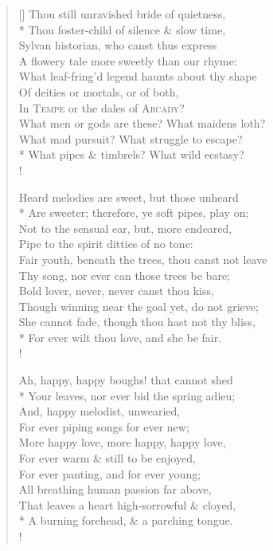 \settowidth{\versewidth}{    Are sweeter; therefore, ye soft pipes, play on;}
\begin{verse}[\versewidth]
Thou still unravished bride of quietness,\\*
\vin Thou foster-child of silence \& slow time,\\
Sylvan historian, who canst thus express\\
\vin A flowery tale more sweetly than our rhyme:\\
What leaf-fring'd legend haunts about thy shape\\
\vin Of deities or mortals, or of both,\\
\vin \vin In \textsc{Tempe} or the dales of \textsc{Arcady}?\\
\vin What men or gods are these? What maidens loth?\\
What mad pursuit? What struggle to escape?\\*
\vin \vin What pipes \& timbrels? What wild ecstasy?\\!

Heard melodies are sweet, but those unheard\\*
\vin Are sweeter; therefore, ye soft pipes, play on;\\
Not to the sensual ear, but, more endeared,\\
\vin Pipe to the spirit ditties of no tone:\\
Fair youth, beneath the trees, thou canst not leave\\
\vin Thy song, nor ever can those trees be bare;\\
\vin \vin Bold lover, never, never canst thou kiss,\\
Though winning near the goal yet, do not grieve;\\
\vin She cannot fade, though thou hast not thy bliss,\\*
\vin \vin For ever wilt thou love, and she be fair.\\!

Ah, happy, happy boughs! that cannot shed\\*
\vin Your leaves, nor ever bid the spring adieu;\\
And, happy melodist, unwearied,\\
\vin For ever piping songs for ever new;\\
More happy love, more happy, happy love,\\
\vin For ever warm \& still to be enjoyed,\\
\vin \vin For ever panting, and for ever young;\\
All breathing human passion far above,\\
\vin That leaves a heart high-sorrowful \& cloyed,\\*
\vin \vin A burning forehead, \& a parching tongue.\\!


\end{verse}
